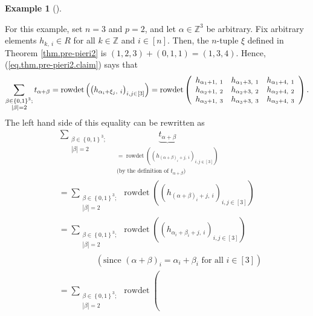 \documentclass
[numbers=enddot,12pt,final,onecolumn,notitlepage,english]{scrartcl}%
\theoremstyle{definition}
\newtheorem{exam}[theo]{Example}
\newenvironment{example}[1][]
{\begin{exam}[#1]\begin{leftbar}}
{\end{leftbar}\end{exam}}
\let\sumnonlimits\sum
\renewcommand{\sum}{\sumnonlimits\limits}
\begin{document}
\begin{example}
For this example, set $n=3$ and $p=2$, and let $\alpha\in\mathbb{Z}^{3}$ be
arbitrary. Fix arbitrary elements $h_{k,\ i}\in R$ for all $k\in\mathbb{Z}$
and $i\in\left[  n\right]  $. Then, the $n$-tuple $\xi$ defined in Theorem
\ref{thm.pre-pieri2} is $\left(  1,2,3\right)  +\left(  0,1,1\right)  =\left(
1,3,4\right)  $. Hence, (\ref{eq.thm.pre-pieri2.claim}) says that%
\[
\sum_{\substack{\beta\in\left\{  0,1\right\}  ^{3};\\\left\vert \beta
\right\vert =2}}t_{\alpha+\beta}=\operatorname*{rowdet}\left(  \left(
h_{\alpha_{i}+\xi_{j},\ i}\right)  _{i,j\in\left[  3\right]  }\right)
=\operatorname*{rowdet}\left(
\begin{array}
[c]{ccc}%
h_{\alpha_{1}+1,\ 1} & h_{\alpha_{1}+3,\ 1} & h_{\alpha_{1}+4,\ 1}\\
h_{\alpha_{2}+1,\ 2} & h_{\alpha_{2}+3,\ 2} & h_{\alpha_{2}+4,\ 2}\\
h_{\alpha_{3}+1,\ 3} & h_{\alpha_{3}+3,\ 3} & h_{\alpha_{3}+4,\ 3}%
\end{array}
\right)  .
\]
The left hand side of this equality can be rewritten as%
\begin{align*}
&  \sum_{\substack{\beta\in\left\{  0,1\right\}  ^{3};\\\left\vert
\beta\right\vert =2}}\ \ \underbrace{t_{\alpha+\beta}}%
_{\substack{=\operatorname*{rowdet}\left(  \left(  h_{\left(  \alpha
+\beta\right)  _{i}+j,\ i}\right)  _{i,j\in\left[  3\right]  }\right)
\\\text{(by the definition of }t_{\alpha+\beta}\text{)}}}\\
&  =\sum_{\substack{\beta\in\left\{  0,1\right\}  ^{3};\\\left\vert
\beta\right\vert =2}}\operatorname*{rowdet}\left(  \left(  h_{\left(
\alpha+\beta\right)  _{i}+j,\ i}\right)  _{i,j\in\left[  3\right]  }\right) \\
&  =\sum_{\substack{\beta\in\left\{  0,1\right\}  ^{3};\\\left\vert
\beta\right\vert =2}}\operatorname*{rowdet}\left(  \left(  h_{\alpha_{i}%
+\beta_{i}+j,\ i}\right)  _{i,j\in\left[  3\right]  }\right) \\
&  \ \ \ \ \ \ \ \ \ \ \ \ \ \ \ \ \ \ \ \ \left(  \text{since }\left(
\alpha+\beta\right)  _{i}=\alpha_{i}+\beta_{i}\text{ for all }i\in\left[
3\right]  \right) \\
&  =\sum_{\substack{\beta\in\left\{  0,1\right\}  ^{3};\\\left\vert
\beta\right\vert =2}}\operatorname*{rowdet}\left(

\end{align*}
\end{example}
\end{document}
